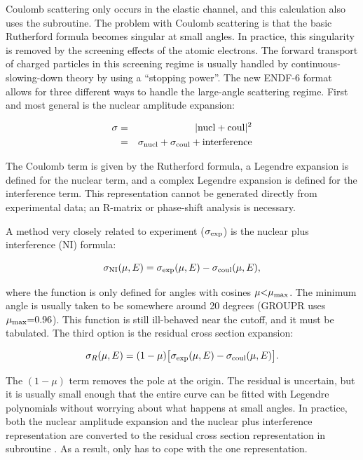 Coulomb scattering only occurs in the
elastic channel, and this calculation also uses the
 subroutine.  The problem with Coulomb scattering
is that the basic Rutherford formula
becomes singular at small angles.  In practice, this singularity
is removed by the screening effects of the atomic electrons.
  The forward transport of charged
particles in this screening regime is usually handled by
continuous-slowing-down theory by using a ``stopping power''.
The new ENDF-6 format allows for three different ways to handle the
large-angle scattering regime.  First and most general is the nuclear
amplitude expansion:

\begin{eqnarray}
   \sigma&=&|{\rm nucl} + {\rm coul}|^2\nonumber\\
         &=& \sigma_{\rm nucl}+\sigma_{\rm coul}+{\rm interference}
\end{eqnarray}

\noindent
The Coulomb term is given by the Rutherford formula, a Legendre
expansion is defined for the nuclear term, and a complex Legendre
expansion is defined for the interference term.  This representation
cannot be generated directly from experimental data; an R-matrix
or phase-shift analysis is necessary.

A method very closely related to experiment ($\sigma_{\rm exp}$) is the
nuclear plus interference (NI) formula:

\begin{equation}
   \sigma_{\rm NI}(\mu,E)=\sigma_{\rm exp}(\mu,E)
      -\sigma_{\rm coul}(\mu,E),
\end{equation}

\noindent
where the function is only defined for angles with cosines
$\mu{<}\mu_{\rm max}$.  The minimum angle is usually taken to be
somewhere around 20 degrees (GROUPR uses $\mu_{\rm max}{=}0.96$).
This function is still ill-behaved near the cutoff, and it must be
tabulated.  The third option is the residual cross section expansion:

\begin{equation}
   \sigma_R(\mu,E)=(1-\mu)\bigl[\sigma_{\rm exp}(\mu,E)
      -\sigma_{\rm coul}(\mu,E)\bigr].
\end{equation}

\noindent
The $(1-\mu)$ term removes the pole at the origin.  The residual is
uncertain, but it is usually small enough that the entire curve can be
fitted with Legendre polynomials without worrying about what happens at
small angles.   In practice, both the nuclear amplitude expansion and
the nuclear plus interference representation are converted to the
residual cross section representation in subroutine
.  As a result,
 only has to cope with
the one representation.


